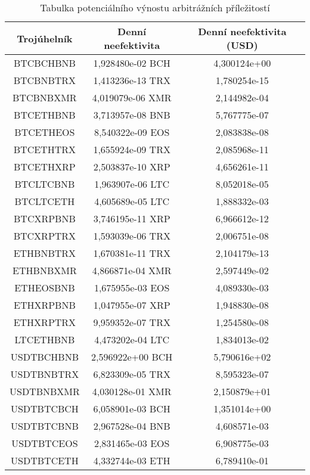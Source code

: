 \begin{table}\centering
\caption{Tabulka potenciálního výnostu arbitrážních příležitostí}
\label{table_gains}
\begin{tabular}{|| c | c | c ||}\hline Trojúhelník & Denní neefektivita & Denní neefektivita (USD)\\ [0.5ex]
 \hline\hline BTCBCHBNB & 1,928480e-02 BCH & 4,300124e+00\\ 
 \hline BTCBNBTRX & 1,413236e-13 TRX & 1,780254e-15\\ 
 \hline BTCBNBXMR & 4,019079e-06 XMR & 2,144982e-04\\ 
 \hline BTCETHBNB & 3,713957e-08 BNB & 5,767775e-07\\ 
 \hline BTCETHEOS & 8,540322e-09 EOS & 2,083838e-08\\ 
 \hline BTCETHTRX & 1,655924e-09 TRX & 2,085968e-11\\ 
 \hline BTCETHXRP & 2,503837e-10 XRP & 4,656261e-11\\ 
 \hline BTCLTCBNB & 1,963907e-06 LTC & 8,052018e-05\\ 
 \hline BTCLTCETH & 4,605689e-05 LTC & 1,888332e-03\\ 
 \hline BTCXRPBNB & 3,746195e-11 XRP & 6,966612e-12\\ 
 \hline BTCXRPTRX & 1,593039e-06 TRX & 2,006751e-08\\ 
 \hline ETHBNBTRX & 1,670381e-11 TRX & 2,104179e-13\\ 
 \hline ETHBNBXMR & 4,866871e-04 XMR & 2,597449e-02\\ 
 \hline ETHEOSBNB & 1,675955e-03 EOS & 4,089330e-03\\ 
 \hline ETHXRPBNB & 1,047955e-07 XRP & 1,948830e-08\\ 
 \hline ETHXRPTRX & 9,959352e-07 TRX & 1,254580e-08\\ 
 \hline LTCETHBNB & 4,473202e-04 LTC & 1,834013e-02\\ 
 \hline USDTBCHBNB & 2,596922e+00 BCH & 5,790616e+02\\ 
 \hline USDTBNBTRX & 6,823309e-05 TRX & 8,595323e-07\\ 
 \hline USDTBNBXMR & 4,030128e-01 XMR & 2,150879e+01\\ 
 \hline USDTBTCBCH & 6,058901e-03 BCH & 1,351014e+00\\ 
 \hline USDTBTCBNB & 2,967528e-04 BNB & 4,608571e-03\\ 
 \hline USDTBTCEOS & 2,831465e-03 EOS & 6,908775e-03\\ 
 \hline USDTBTCETH & 4,332744e-03 ETH & 6,789410e-01\\ 

\end{tabular}
\end{table}
